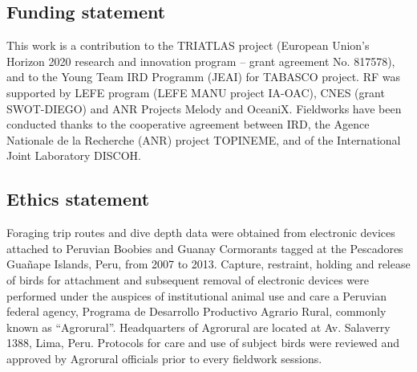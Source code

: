 \documentclass{article}
\begin{document}
\subsection*{Funding statement}
This work is a contribution to the TRIATLAS project (European Union's Horizon 2020 research and innovation program – grant agreement No. 817578), and to the Young Team IRD Programm (JEAI) for TABASCO project. RF was supported by LEFE program (LEFE MANU project IA-OAC), CNES (grant SWOT-DIEGO) and ANR Projects Melody and OceaniX. Fieldworks have been conducted thanks to the cooperative agreement between IRD, the Agence Nationale de la Recherche (ANR) project TOPINEME, and of the International Joint Laboratory DISCOH.

\subsection*{Ethics statement}
Foraging trip routes and dive depth data were obtained from electronic devices attached to Peruvian Boobies and Guanay Cormorants tagged at the Pescadores  Gua\~nape Islands, Peru, from 2007 to 2013. Capture, restraint, holding and release of birds for attachment and subsequent removal of electronic devices were performed under the auspices of institutional animal use and care a Peruvian federal agency, Programa de Desarrollo Productivo Agrario Rural, commonly known as “Agrorural”. Headquarters of Agrorural are located at Av. Salaverry 1388, Lima, Peru. Protocols for care and use of subject birds were reviewed and approved by Agrorural officials prior to every fieldwork sessions.


\printbibliography

\newpage
\end{document}
